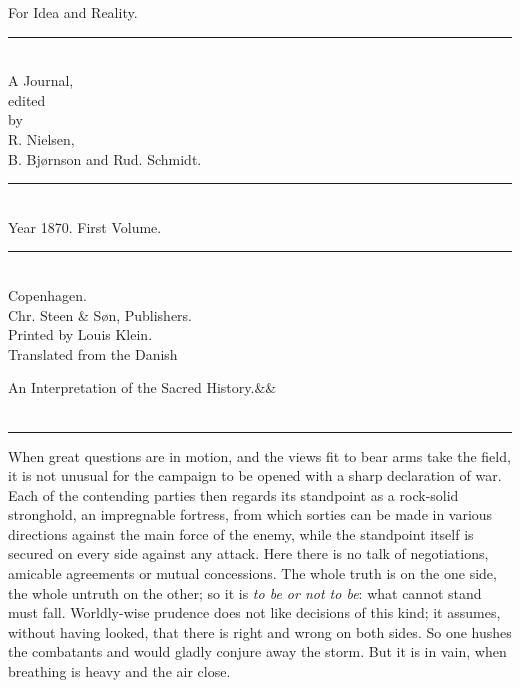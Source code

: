 \documentclass[12pt,a4paper,openany]{book}
\newcommand{\opage}[1]{\marginnote{\footnotesize\textit{[#1]}}}
\newcommand{\essayhead}[2]{\begin{center}{\large #1}\ifx&#2&\else\\[0.3em]{\normalsize #2}\fi\\[0.5em]\rule{3em}{0.4pt}\end{center}\medskip\noindent}
\begin{document}
\begin{titlepage}
\begin{center}
\vspace*{3em}
{\Huge For Idea and Reality.}\\[1em]
\rule{8em}{0.4pt}\\[1em]
{\large A Journal,}\\[0.8em]
{\small edited}\\[0.4em]
{\footnotesize by}\\[0.6em]
{\large R. Nielsen,}\\[0.4em]
{\large B. Bjørnson and Rud. Schmidt.}\\[1em]
\rule{8em}{0.4pt}\\[0.6em]
{\large Year 1870. First Volume.}\\[0.6em]
\rule{8em}{0.4pt}\\[4em]
Copenhagen.\\[0.4em]
Chr. Steen \& Søn, Publishers.\\[1.5em]
{\small Printed by Louis Klein.}\\[3em]
{\small Translated from the Danish}
\end{center}
\end{titlepage}

\essayhead{An Interpretation of the Sacred History.}{}
\setcounter{footnote}{0}%
\opage{289}When great questions are in motion, and the views fit to bear arms
take the field, it is not unusual
for the campaign to be opened with a sharp declaration of war.
Each of the contending parties then regards
its standpoint as a rock-solid stronghold, an impregnable
fortress, from which sorties can be made in various directions
against the main force of the enemy, while the standpoint
itself is secured on every side against any attack.
Here there is no talk of negotiations, amicable
agreements or mutual concessions. The whole
truth is on the one side, the whole untruth on
the other; so it is \emph{to be or not to be}: what
cannot stand must fall. Worldly-wise prudence
does not like decisions of this kind; it assumes, without having looked,
that there is right and wrong on both sides. So
one hushes the combatants and would gladly conjure away
the storm. But it is in vain, when breathing is
heavy and the air close.
\end{document}
